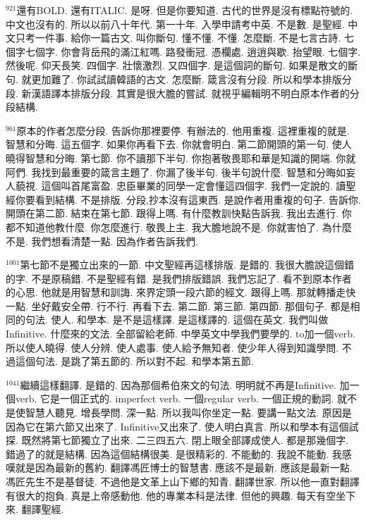 \documentclass{book}
\begin{document}
$^{921}$還有BOLD.
還有ITALIC.
是呀.
但是你要知道.
古代的世界是沒有標點符號的.
中文也沒有的.
所以以前八十年代.
第一十年.
入學申請考中英.
不是數.
是聖經.
中文只考一件事.
給你一篇古文.
叫你斷句.
懂不懂.
不懂.
怎麼斷.
不是七言古詩.
七個字七個字.
你會背岳飛的滿江紅嗎.
路發衝冠.
憑欄處.
逍逍與歇.
抬望眼.
七個字.
然後呢.
仰天長笑.
四個字.
壯懷激烈.
又四個字.
是這個詞的斷句.
如果是散文的斷句.
就更加難了.
你試試讀韓語的古文.
怎麼斷.
箴言沒有分段.
所以和學本排版分段.
新漢語譯本排版分段.
其實是很大膽的嘗試.
就視乎編輯明不明白原本作者的分段結構.

$^{961}$原本的作者怎麼分段.
告訴你那裡要停.
有辦法的.
他用重複.
這裡重複的就是.
智慧和分晦.
這五個字.
如果你再看下去.
你就會明白.
第二節開頭的第一句.
使人曉得智慧和分晦.
第七節.
你不讀那下半句.
你抱著敬畏耶和華是知識的開端.
你就阿們.
我找到最重要的箴言主題了.
你漏了後半句.
後半句說什麼.
智慧和分晦如妄人藐視.
這個叫首尾富盈.
忠臣畢業的同學一定會懂這四個字.
我們一定說的.
讀聖經你要看到結構.
不是排版.
分段,抄本沒有這東西.
是說作者用重複的句子.
告訴你.
開頭在第二節.
結束在第七節.
跟得上嗎.
有什麼教訓快點告訴我.
我出去進行.
你都不知道他教什麼.
你怎麼進行.
敬畏上主.
我大膽地說不是.
你就害怕了.
為什麼不是.
我們想看清楚一點.
因為作者告訴我們.

$^{1001}$第七節不是獨立出來的一節.
中文聖經再這樣排版.
是錯的.
我很大膽說這個錯的字.
不是原稿錯.
不是聖經有錯.
是我們排版錯誤.
我們忘記了.
看不到原本作者的心思.
他就是用智慧和訓誨.
來界定頭一段六節的經文.
跟得上嗎.
那就轉播走快一點.
坐好戴安全帶.
行不行.
再看下去.
第二節.
第三節.
第四節.
那個句子.
都是相同的句法.
使人.
和學本.
是不是這樣譯.
是這樣譯的.
這個在英文.
我們叫做Infinitive.
什麼來的文法.
全部留給老師.
中學英文中學我們要學的.
to加一個verb.
所以使人曉得.
使人分辨.
使人處事.
使人給予無知者.
使少年人得到知識學問.
不過這個句法.
是跳了第五節的.
所以對不起.
和學本第五節.

$^{1041}$繼續這樣翻譯.
是錯的.
因為那個希伯來文的句法.
明明就不再是Infinitive.
加一個verb.
它是一個正式的.
imperfect verb.
一個regular verb.
一個正規的動詞.
就不是使智慧人聽見.
增長學問.
深一點.
所以我叫你坐定一點.
要講一點文法.
原因是因為它在第六節又出來了.
Infinitive又出來了.
使人明白真言.
所以和學本有這個試探.
既然將第七節獨立了出來.
二三四五六.
閉上眼全部譯成使人.
都是那幾個字.
錯過了的就是結構.
因為這個結構很美.
是很精彩的.
不能動的.
我說不能動.
我感嘆就是因為最新的舊約.
翻譯馮匠博士的智慧書.
應該不是最新.
應該是最新一點.
馮匠先生不是基督徒.
不過他是文革上山下鄉的知青.
翻譯世家.
所以他一直對翻譯有很大的抱負.
真是上帝感動他.
他的專業本科是法律.
但他的興趣.
每天有空坐下來.
翻譯聖經.
\end{document}
